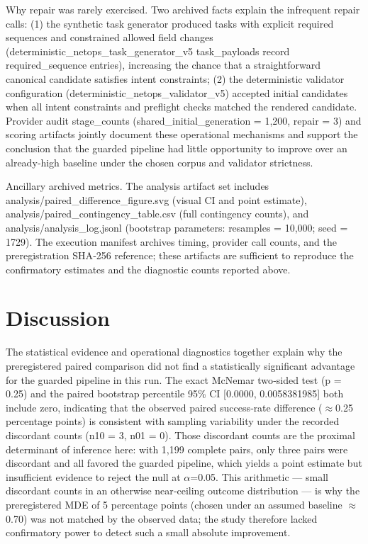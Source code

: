 \documentclass[conference]{IEEEtran}
\begin{document}
Why repair was rarely exercised. Two archived facts explain the infrequent repair calls: (1) the synthetic task generator produced tasks with explicit required sequences and constrained allowed field changes (deterministic\_netops\_task\_generator\_v5 task\_payloads record required\_sequence entries), increasing the chance that a straightforward canonical candidate satisfies intent constraints; (2) the deterministic validator configuration (deterministic\_netops\_validator\_v5) accepted initial candidates when all intent constraints and preflight checks matched the rendered candidate. Provider audit stage\_counts (shared\_initial\_generation = 1,200, repair = 3) and scoring artifacts jointly document these operational mechanisms and support the conclusion that the guarded pipeline had little opportunity to improve over an already‑high baseline under the chosen corpus and validator strictness.

Ancillary archived metrics. The analysis artifact set includes analysis/paired\_difference\_figure.svg (visual CI and point estimate), analysis/paired\_contingency\_table.csv (full contingency counts), and analysis/analysis\_log.jsonl (bootstrap parameters: resamples = 10,000; seed = 1729). The execution manifest archives timing, provider call counts, and the preregistration SHA‑256 reference; these artifacts are sufficient to reproduce the confirmatory estimates and the diagnostic counts reported above.

\section{Discussion}
The statistical evidence and operational diagnostics together explain why the preregistered paired comparison did not find a statistically significant advantage for the guarded pipeline in this run. The exact McNemar two‑sided test (p = 0.25) and the paired bootstrap percentile 95\% CI [0.0000, 0.0058381985] both include zero, indicating that the observed paired success‑rate difference (\ensuremath{\approx}0.25 percentage points) is consistent with sampling variability under the recorded discordant counts (n10 = 3, n01 = 0). Those discordant counts are the proximal determinant of inference here: with 1,199 complete pairs, only three pairs were discordant and all favored the guarded pipeline, which yields a point estimate but insufficient evidence to reject the null at \ensuremath{\alpha}=0.05. This arithmetic --- small discordant counts in an otherwise near‑ceiling outcome distribution --- is why the preregistered MDE of 5 percentage points (chosen under an assumed baseline \ensuremath{\approx}0.70) was not matched by the observed data; the study therefore lacked confirmatory power to detect such a small absolute improvement.
\end{document}
